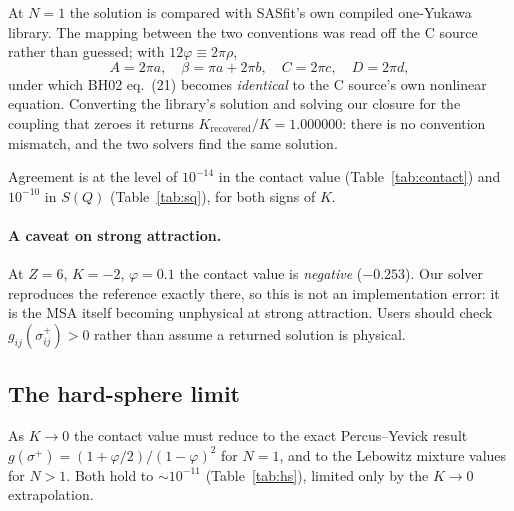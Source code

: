 \documentclass[11pt,a4paper]{article}
\newcommand{\eqBH}[1]{eq.~(#1)}
\begin{document}
At $N=1$ the solution is compared with SASfit's own compiled one-Yukawa
library. The mapping between the two conventions was read off the C source
rather than guessed; with $12\varphi\equiv2\pi\rho$,
\begin{equation}
  A=2\pi a,\quad \beta=\pi a+2\pi b,\quad C=2\pi c,\quad D=2\pi d,
\end{equation}
under which BH02 \eqBH{21} becomes \emph{identical} to the C source's own
nonlinear equation. Converting the library's solution and solving our closure
for the coupling that zeroes it returns $K_{\text{recovered}}/K=1.000000$: there
is no convention mismatch, and the two solvers find the same solution.

\begin{table}[htbp]
\centering\small
\caption{Contact value at $N=1$ against the reference library's exact
$(a+b)-cZe^{-Z}$. The last three rows have $K<0$, i.e.\ repulsive.}
\label{tab:contact}

\end{table}

\begin{table}[htbp]
\centering\small
\caption{$S(Q)$ at $N=1$ against the reference library, worst relative error
over $12$ values of $Q\in[0.1,400]$.}
\label{tab:sq}

\end{table}

Agreement is at the level of $10^{-14}$ in the contact value
(Table~\ref{tab:contact}) and $10^{-10}$ in $S(Q)$ (Table~\ref{tab:sq}), for
both signs of $K$.

\paragraph{A caveat on strong attraction.} At $Z=6$, $K=-2$, $\varphi=0.1$ the
contact value is \emph{negative} ($-0.253$). Our solver reproduces the
reference exactly there, so this is not an implementation error: it is the MSA
itself becoming unphysical at strong attraction. Users should check
$g_{ij}(\sigma^+_{ij})>0$ rather than assume a returned solution is physical.

\subsection{The hard-sphere limit}

As $K\to0$ the contact value must reduce to the exact Percus--Yevick result
$g(\sigma^+)=(1+\varphi/2)/(1-\varphi)^2$ for $N=1$, and to the Lebowitz
mixture values for $N>1$. Both hold to $\sim10^{-11}$
(Table~\ref{tab:hs}), limited only by the $K\to0$ extrapolation.
\end{document}
